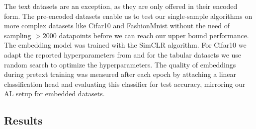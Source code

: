 \documentclass[]{article}
\begin{document}
The text datasets are an exception, as they are only offered in their encoded form.
The pre-encoded datasets enable us to test our single-sample algorithms on more complex datasets like Cifar10 and FashionMnist without the need of sampling $>2000$ datapoints before we can reach our upper bound performance.
The embedding model was trained with the SimCLR \cite{chen2020simple} algorithm. 
For Cifar10 we adapt the reported hyperparameters from \cite{hacohen2022active} and for the tabular datasets we use random search to optimize the hyperparameters.
The quality of embeddings during pretext training was measured after each epoch by attaching a linear classification head and evaluating this classifier for test accuracy, mirroring our AL setup for embedded datasets.

\subsection{Results}
\end{document}
